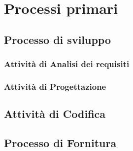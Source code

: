 
\section{Processi primari}
	\subsection{Processo di sviluppo}
		\subsubsection{Attività di Analisi dei requisiti}
			
			
			
			
			
		\subsubsection{Attività di Progettazione}
		\subsection{Attività di Codifica}
		
	\subsection{Processo di Fornitura}
